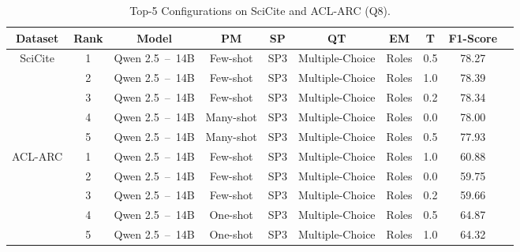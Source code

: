 \begin{table*}[t]
    \centering
    \footnotesize
    \begin{tabular}{cccccccccc}
        \hline
        \textbf{Dataset}            & \textbf{Rank}     & \textbf{Model}       & \textbf{PM}    & \textbf{SP}   & \textbf{QT}       & \textbf{EM}   & \textbf{T}    & \textbf{F1-Score} \\
        \hline
        \multirow{5}{*}{SciCite}    & 1                 & Qwen 2.5~--~14B       & Few-shot      & SP3           & Multiple-Choice   & Roles         & 0.5           & 78.27 \\
                                    & 2                 & Qwen 2.5~--~14B       & Few-shot      & SP3           & Multiple-Choice   & Roles         & 1.0           & 78.39 \\
                                    & 3                 & Qwen 2.5~--~14B       & Few-shot      & SP3           & Multiple-Choice   & Roles         & 0.2           & 78.34 \\
                                    & 4                 & Qwen 2.5~--~14B       & Many-shot     & SP3           & Multiple-Choice   & Roles         & 0.0           & 78.00 \\
                                    & 5                 & Qwen 2.5~--~14B       & Many-shot     & SP3           & Multiple-Choice   & Roles         & 0.5           & 77.93 \\
        \hline
        \multirow{5}{*}{ACL-ARC}    & 1                 & Qwen 2.5~--~14B       & Few-shot      & SP3           & Multiple-Choice   & Roles         & 1.0           & 60.88 \\
                                    & 2                 & Qwen 2.5~--~14B       & Few-shot      & SP3           & Multiple-Choice   & Roles         & 0.0           & 59.75 \\
                                    & 3                 & Qwen 2.5~--~14B       & Few-shot      & SP3           & Multiple-Choice   & Roles         & 0.2           & 59.66 \\
                                    & 4                 & Qwen 2.5~--~14B       & One-shot      & SP3           & Multiple-Choice   & Roles         & 0.5           & 64.87 \\
                                    & 5                 & Qwen 2.5~--~14B       & One-shot      & SP3           & Multiple-Choice   & Roles         & 1.0           & 64.32 \\
        \hline
    \end{tabular}
    \caption{Top-5 Configurations on SciCite and ACL-ARC (Q8).}
    \label{tab:top_5_configurations}
\end{table*}

